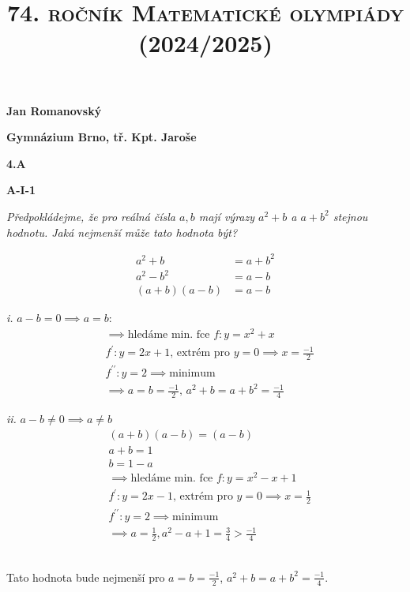\documentclass{article}
\title{\normalsize{\vspace{-2cm}\textsc{74. ročník Matematické olympiády (2024/2025)}\vspace{-1.7cm}}}
\date{}
\author{}
\begin{document}
\maketitle

\textbf{ }

\noindent \textbf{Jan Romanovský}

\noindent \textbf{Gymnázium Brno, tř. Kpt. Jaroše}

\noindent \textbf{4.A}

\noindent \textbf{A-\textrm{I}-1}

\textbf{ }

\textit{Předpokládejme, že pro reálná čísla $a, b$ mají výrazy $a^2 + b$ a $a + b^2$ stejnou hodnotu. Jaká nejmenší může tato hodnota být?}

\begin{align*}
  a^2 + b &= a + b^2\\
  a^2 - b^2 &= a-b\\
  (a+b)(a-b) &= a-b
\end{align*}

\textbf{ }

{\begin{minipage}[t]{0.49\textwidth}
    \textit{i.} $a-b=0 \implies a =b$:
  \begin{align*}
    &\implies \text{hledáme min. fce } f: y = x^2 + x\\
    &f^\prime :y = 2x + 1 \text{, extrém pro } y = 0 \implies x = \frac{-1}{2}\\
    &f^{\prime \prime}: y = 2 \implies \text{minimum}\\
    &\implies a = b = \frac{-1}{2} \text{, } a^2 + b = a + b^2 = \frac{-1}{4}
  \end{align*}
\end{minipage}
\hfill
\noindent\begin{minipage}[t]{0.49\textwidth}
    \textit{ii.} $a-b \neq 0 \implies a \neq b$
  \begin{align*}
    &(a+b)(a-b)=(a-b)\\
    &a+b = 1\\
  &b = 1-a\\
    &\implies \text{hledáme min. fce } f: y = x^2 -x +1\\
    &f^\prime: y = 2x -1 \text{, extrém pro } y = 0 \implies x = \frac{1}{2}\\
    &f^{\prime \prime}:y =2 \implies \text{minimum}\\
    &\implies a = \frac{1}{2}, a^2 - a + 1 = \frac{3}{4} > \frac{-1}{4}
  \end{align*}
\end{minipage}}

\,\\

Tato hodnota bude nejmenší pro $a = b = \frac{-1}{2}$, $a^2 + b = a + b^2 = \frac{-1}{4}$.
\end{document}
